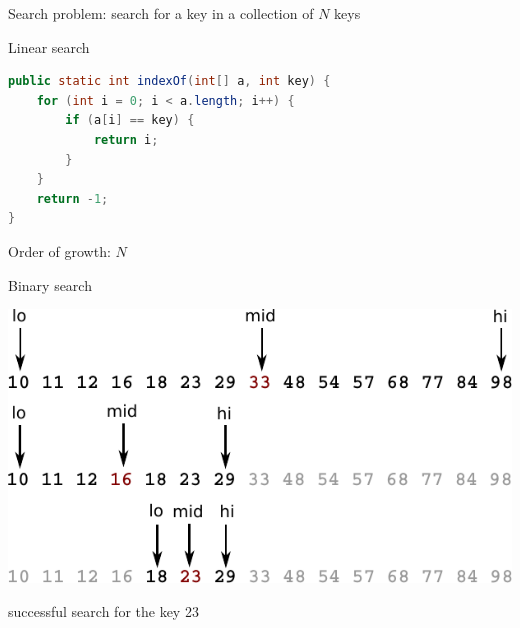 \documentclass[8pt,a4paper,compress]{beamer}
\begin{document}
\begin{frame}[fragile]
Search problem: search for a key in a collection of $N$ keys

\bigskip

Linear search
\begin{lstlisting}[language=Java]
public static int indexOf(int[] a, int key) {
    for (int i = 0; i < a.length; i++) {
        if (a[i] == key) { 
            return i; 
        }
    }
    return -1;
}
\end{lstlisting}

Order of growth: $N$

\bigskip

Binary search
\begin{center}
\includegraphics[scale=0.65]{./figures/bs1.pdf}

\smallskip

successful search for the key 23
\end{center}
\end{frame}
\end{document}
